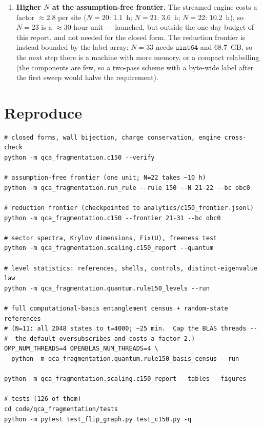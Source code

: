 \documentclass[11pt]{article}
\theoremstyle{plain}
\theoremstyle{definition}
\begin{document}
\begin{enumerate}
  acquires a $\mathbb{Z}_2$ gauge redundancy and \eqref{eq:coin} needs a flux
  sector; that is the next natural step.
\item \textbf{Higher $N$ at the assumption-free frontier.} The streamed engine
  costs a factor $\approx2.8$ per site ($N=20$: $1.1$~h; $N=21$: $3.6$~h;
  $N=22$: $10.2$~h), so $N=23$ is a $\approx30$-hour unit --- launched, but
  outside the one-day budget of this report, and not needed for the closed form.
  The reduction frontier is instead
  bounded by the label array: $N=33$ needs $\mathtt{uint64}$ and $68.7$~GB, so
  the next step there is a machine with more memory, or a compact relabelling
  (the components are few, so a two-pass scheme with a byte-wide label after the
  first sweep would halve the requirement).
\end{enumerate}

\section{Reproduce}

\begin{verbatim}
# closed forms, wall bijection, charge conservation, engine cross-check
python -m qca_fragmentation.c150 --verify

# assumption-free frontier (one unit; N=22 takes ~10 h)
python -m qca_fragmentation.run_rule --rule 150 --N 21-22 --bc obc0

# reduction frontier (checkpointed to analytics/c150_frontier.jsonl)
python -m qca_fragmentation.c150 --frontier 21-31 --bc obc0

# sector spectra, Krylov dimensions, Fix(U), freeness test
python -m qca_fragmentation.scaling.c150_report --quantum

# level statistics: references, shells, controls, distinct-eigenvalue law
python -m qca_fragmentation.quantum.rule150_levels --run

# full computational-basis entanglement census + random-state references
# (N=11: all 2048 states to t=4000; ~25 min.  Cap the BLAS threads --
#  the default oversubscribes and costs a factor 2.)
OMP_NUM_THREADS=4 OPENBLAS_NUM_THREADS=4 \
  python -m qca_fragmentation.quantum.rule150_basis_census --run

python -m qca_fragmentation.scaling.c150_report --tables --figures

# tests (126 of them)
cd code/qca_fragmentation/tests
python -m pytest test_flip_graph.py test_c150.py -q
\end{verbatim}
\end{document}
